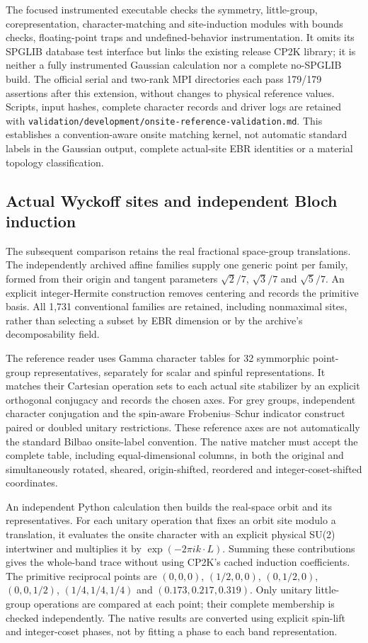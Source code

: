 \documentclass[11pt]{article}
\begin{document}
The focused instrumented executable checks the symmetry, little-group,
corepresentation, character-matching and site-induction modules with
bounds checks, floating-point traps and undefined-behavior
instrumentation. It omits its SPGLIB database test interface but links
the existing release CP2K library; it is neither a fully instrumented
Gaussian calculation nor a complete no-SPGLIB build. The official
serial and two-rank MPI directories each pass 179/179 assertions
after this extension, without changes to physical reference values.
Scripts, input hashes, complete character records and driver logs are
retained with \texttt{validation/development/onsite-reference-validation.md}.
This establishes a convention-aware onsite matching kernel, not
automatic standard labels in the Gaussian output, complete
actual-site EBR identities or a material topology classification.

\subsection{Actual Wyckoff sites and independent Bloch induction}
The subsequent comparison retains the real fractional space-group
translations. The independently archived affine families supply one
generic point per family, formed from their origin and tangent
parameters $\sqrt{2}/7$, $\sqrt{3}/7$ and $\sqrt{5}/7$. An explicit
integer-Hermite construction removes centering and records the
primitive basis. All 1,731 conventional families are retained,
including nonmaximal sites, rather than selecting a subset by EBR
dimension or by the archive's decomposability field.

The reference reader uses Gamma character tables for 32 symmorphic
point-group representatives, separately for scalar and spinful
representations. It matches their Cartesian operation sets to each
actual site stabilizer by an explicit orthogonal conjugacy and
records the chosen axes. For grey groups, independent character
conjugation and the spin-aware Frobenius--Schur indicator construct
paired or doubled unitary restrictions. These reference axes are
not automatically the standard Bilbao onsite-label convention.
The native matcher must accept the complete table, including
equal-dimensional columns, in both the original and simultaneously
rotated, sheared, origin-shifted, reordered and integer-coset-shifted
coordinates.

An independent Python calculation then builds the real-space orbit
and its representatives. For each unitary operation that fixes an
orbit site modulo a translation, it evaluates the onsite character
with an explicit physical SU(2) intertwiner and multiplies it by
$\exp(-2\pi i k\cdot L)$. Summing these contributions gives the
whole-band trace without using CP2K's cached induction coefficients.
The primitive reciprocal points are
$(0,0,0)$, $(1/2,0,0)$, $(0,1/2,0)$, $(0,0,1/2)$,
$(1/4,1/4,1/4)$ and $(0.173,0.217,0.319)$.
Only unitary little-group operations are compared at each point;
their complete membership is checked independently. The native
results are converted using explicit spin-lift and integer-coset
phases, not by fitting a phase to each band representation.
\end{document}
